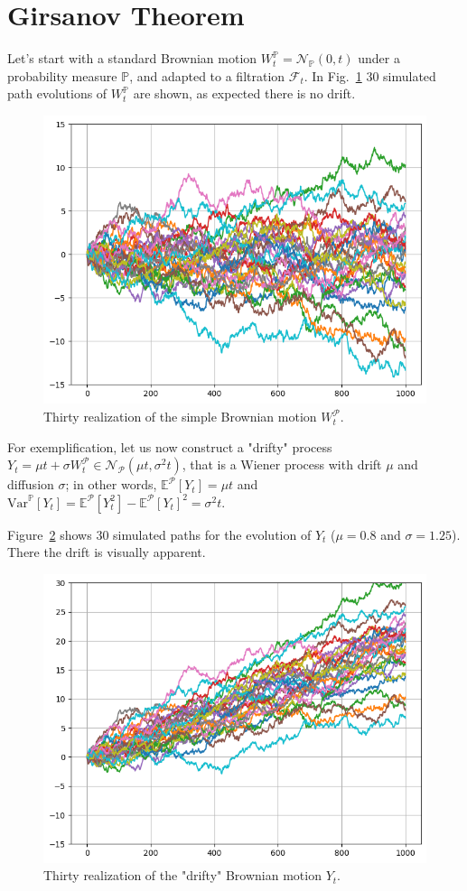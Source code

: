 \documentclass[12pt,a4paper]{book}
\begin{document}
\section{Girsanov Theorem}
\begin{question}[subtitle=Drifty Brownian Motion]
Let’s start with a standard Brownian motion $W_t^{\mathbb{P}} = \mathcal{N}_{\mathbb{P}}(0,t)$ under a probability measure $\mathbb{P}$, and adapted to a filtration $\mathcal{F}_t$. In Fig.~\ref{fig:brownian_motion_nodrift} 30 simulated path evolutions of $W_t^{\mathbb{P}}$ are shown, as expected there is no drift.
	
\begin{figure}[htbp]
	\begin{center}
		\includegraphics[width=0.5\linewidth]{addons/brownian_motion_nodrift}
	\end{center}
	\label{fig:brownian_motion_nodrift}
	\caption{Thirty realization of the simple Brownian motion $W_t^{\mathcal{P}}$.}
\end{figure}

For exemplification, let us now construct a "drifty" process $Y_t=\mu t+\sigma W_t^{\mathcal{P}}\in \mathcal{N}_{\mathcal{P}}(\mu t, \sigma^2 t)$, that is a Wiener process with drift $\mu$ and diffusion $\sigma$; in other words, $\mathbb{E}^{\mathcal{P}}[Y_t]=\mu t$ and $\text{Var}^{\mathbb{P}}[Y_t]=\mathbb{E}^{\mathcal{P}}[Y^2_t]-\mathbb{E}^{\mathcal{P}}[Y_t]^2=\sigma^2 t$.

Figure~\ref{fig:brownian_motion_drift} shows 30 simulated paths for the evolution of $Y_t$ ($\mu = 0.8$ and $\sigma =1.25$). There the drift is visually apparent.
\begin{figure}[htbp]
\begin{center}
	\includegraphics[width=0.5\linewidth]{addons/brownian_motion_drift}
\end{center}
\label{fig:brownian_motion_drift}
	\caption{Thirty realization of the "drifty" Brownian motion $Y_t$.}
\end{figure}


\end{question}
\end{document}
